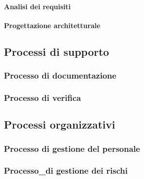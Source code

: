 \documentclass[../piano-di-qualifica.tex]{subfiles}
\begin{document}
\paragraph{Analisi dei requisiti}%
\label{par:analisi_dei_requisiti}

\paragraph{Progettazione architetturale}%
\label{par:progettazione_architetturale}

\subsection{Processi di supporto}%
\label{sub:processi_di_supporto}

\subsubsection{Processo di documentazione}%
\label{subs:processo_di_documentazione}

\subsubsection{Processo di verifica}%
\label{subs:processo_di_verifica}

\subsection{Processi organizzativi}%
\label{sub:processi_organizzativi}

\subsubsection{Processo di gestione del personale}%
\label{processo_di_gestione_del_personale}

\subsubsection{Processo_di gestione dei rischi}%
\label{processo_di_gestione_dei_rischi}


\end{document}
